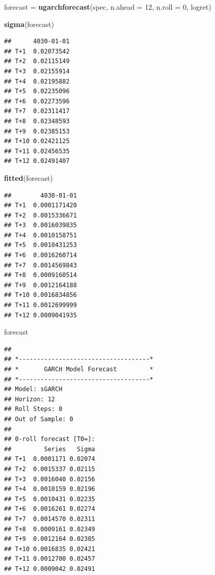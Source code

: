 \documentclass[
]{book}
\newenvironment{Shaded}{\begin{snugshade}}{\end{snugshade}}
\newcommand{\AttributeTok}[1]{\textcolor[rgb]{0.13,0.29,0.53}{#1}}
\newcommand{\DecValTok}[1]{\textcolor[rgb]{0.00,0.00,0.81}{#1}}
\newcommand{\FunctionTok}[1]{\textcolor[rgb]{0.13,0.29,0.53}{\textbf{#1}}}
\newcommand{\NormalTok}[1]{#1}
\newcommand{\OtherTok}[1]{\textcolor[rgb]{0.56,0.35,0.01}{#1}}
\begin{document}
\begin{Shaded}
\begin{Highlighting}[]
\NormalTok{forecast }\OtherTok{=} \FunctionTok{ugarchforecast}\NormalTok{(spec, }\AttributeTok{n.ahead =} \DecValTok{12}\NormalTok{, }\AttributeTok{n.roll =} \DecValTok{0}\NormalTok{, logret)}

\FunctionTok{sigma}\NormalTok{(forecast)}
\end{Highlighting}
\end{Shaded}

\begin{verbatim}
##      4030-01-01
## T+1  0.02073542
## T+2  0.02115149
## T+3  0.02155914
## T+4  0.02195882
## T+5  0.02235096
## T+6  0.02273596
## T+7  0.02311417
## T+8  0.02348593
## T+9  0.02385153
## T+10 0.02421125
## T+11 0.02456535
## T+12 0.02491407
\end{verbatim}

\begin{Shaded}
\begin{Highlighting}[]
\FunctionTok{fitted}\NormalTok{(forecast)}
\end{Highlighting}
\end{Shaded}

\begin{verbatim}
##        4030-01-01
## T+1  0.0001171420
## T+2  0.0015336671
## T+3  0.0016039835
## T+4  0.0010158751
## T+5  0.0010431253
## T+6  0.0016260714
## T+7  0.0014569843
## T+8  0.0009160514
## T+9  0.0012164188
## T+10 0.0016834856
## T+11 0.0012699999
## T+12 0.0009041935
\end{verbatim}

\begin{Shaded}
\begin{Highlighting}[]
\NormalTok{forecast}
\end{Highlighting}
\end{Shaded}

\begin{verbatim}
## 
## *------------------------------------*
## *       GARCH Model Forecast         *
## *------------------------------------*
## Model: sGARCH
## Horizon: 12
## Roll Steps: 0
## Out of Sample: 0
## 
## 0-roll forecast [T0=]:
##         Series   Sigma
## T+1  0.0001171 0.02074
## T+2  0.0015337 0.02115
## T+3  0.0016040 0.02156
## T+4  0.0010159 0.02196
## T+5  0.0010431 0.02235
## T+6  0.0016261 0.02274
## T+7  0.0014570 0.02311
## T+8  0.0009161 0.02349
## T+9  0.0012164 0.02385
## T+10 0.0016835 0.02421
## T+11 0.0012700 0.02457
## T+12 0.0009042 0.02491
\end{verbatim}
\end{document}
